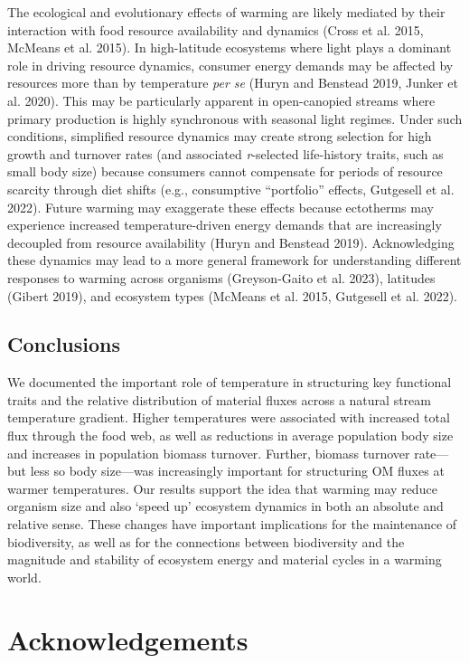 \documentclass[
]{article}
\numberwithin{equation}
\begin{document}
The ecological and evolutionary effects of warming are likely mediated
by their interaction with food resource availability and dynamics (Cross
et al. 2015, McMeans et al. 2015). In high-latitude ecosystems where
light plays a dominant role in driving resource dynamics, consumer
energy demands may be affected by resources more than by temperature
\emph{per se} (Huryn and Benstead 2019, Junker et al. 2020). This may be
particularly apparent in open-canopied streams where primary production
is highly synchronous with seasonal light regimes. Under such
conditions, simplified resource dynamics may create strong selection for
high growth and turnover rates (and associated \emph{r}-selected
life-history traits, such as small body size) because consumers cannot
compensate for periods of resource scarcity through diet shifts (e.g.,
consumptive ``portfolio'' effects, Gutgesell et al. 2022). Future
warming may exaggerate these effects because ectotherms may experience
increased temperature-driven energy demands that are increasingly
decoupled from resource availability (Huryn and Benstead 2019).
Acknowledging these dynamics may lead to a more general framework for
understanding different responses to warming across organisms
(Greyson-Gaito et al. 2023), latitudes (Gibert 2019), and ecosystem
types (McMeans et al. 2015, Gutgesell et al. 2022).

\hypertarget{conclusions}{%
\subsection{Conclusions}\label{conclusions}}

We documented the important role of temperature in structuring key
functional traits and the relative distribution of material fluxes
across a natural stream temperature gradient. Higher temperatures were
associated with increased total flux through the food web, as well as
reductions in average population body size and increases in population
biomass turnover. Further, biomass turnover rate---but less so body
size---was increasingly important for structuring OM fluxes at warmer
temperatures. Our results support the idea that warming may reduce
organism size and also `speed up' ecosystem dynamics in both an absolute
and relative sense. These changes have important implications for the
maintenance of biodiversity, as well as for the connections between
biodiversity and the magnitude and stability of ecosystem energy and
material cycles in a warming world.

\hypertarget{acknowledgements}{%
\section{Acknowledgements}\label{acknowledgements}}
\end{document}
